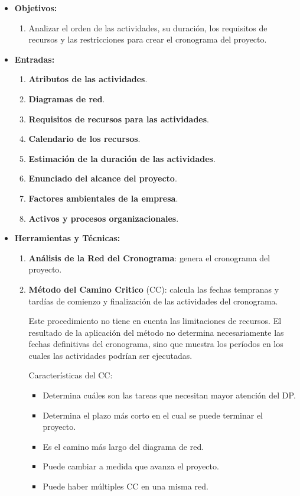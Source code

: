 \documentclass[10pt,a4paper]{article}
\begin{document}
\begin{itemize}
\begin{itemize}
\item \textbf{Objetivos:}
\begin{enumerate}
\item Analizar el orden de las actividades, su duración, los requisitos de recursos y las restricciones para crear el cronograma del proyecto.
\end{enumerate}

\item \textbf{Entradas:}
\begin{enumerate}
\item \textbf{Atributos de las actividades}.
\item \textbf{Diagramas de red}.
\item \textbf{Requisitos de recursos para las actividades}.
\item \textbf{Calendario de los recursos}.
\item \textbf{Estimación de la duración de las actividades}.
\item \textbf{Enunciado del alcance del proyecto}.
\item \textbf{Factores ambientales de la empresa}.
\item \textbf{Activos y procesos organizacionales}.
\end{enumerate}

\item \textbf{Herramientas y Técnicas:}
\begin{enumerate}
\item \textbf{Análisis de la Red del Cronograma}: genera el cronograma del proyecto.
\item \textbf{Método del Camino Critico} (CC): calcula las fechas tempranas y tardías de comienzo y finalización de las actividades del cronograma.

Este procedimiento no tiene en cuenta las limitaciones de recursos. El resultado de la aplicación del método no determina necesariamente las fechas definitivas del cronograma, sino que muestra los períodos en los cuales las actividades podrían ser ejecutadas.

Características del CC:
\begin{itemize}
\item Determina cuáles son las tareas que necesitan mayor atención del DP.
\item Determina el plazo más corto en el cual se puede terminar el proyecto.
\item Es el camino más largo del diagrama de red.
\item Puede cambiar a medida que avanza el proyecto.
\item Puede haber múltiples CC en una misma red.
\end{itemize}


\end{enumerate}
\end{itemize}
\end{itemize}
\end{document}
